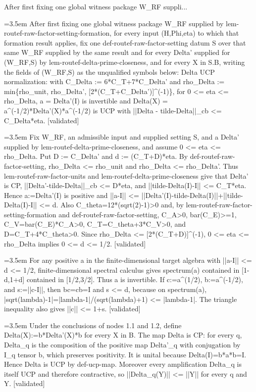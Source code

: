 \documentclass{article}
\newcommand{\step}[1]{\par\noindent\hangindent=3.5em\hangafter=1%
  \makebox[3.5em][l]{\textbf{#1.}}}
\newcommand{\steptag}[1]{\hfill{\small\textsf{[#1]}}}
\begin{document}
\begin{proofbox}{After first fixing one global witness package W\_RF suppli...}
\step{1} After first fixing one global witness package W\_RF supplied by lem-routef-raw-factor-setting-formation, for every input (H,Phi,eta) to which that formation result applies, fix one def-routef-raw-factor-setting datum S over that same W\_RF supplied by the same result and for every Delta' supplied for (W\_RF,S) by lem-routef-delta-prime-closeness, and for every X in S.B, writing the fields of (W\_RF,S) as the unqualified symbols below: Delta UCP normalization: with C\_Delta := 6*C\_T+7*C\_Delta' and rho\_Delta := min\{rho\_unit, rho\_Delta', [2*(C\_T+C\_Delta')]\textasciicircum{}(-1)\}, for 0 <= eta <= rho\_Delta, a = Delta'(I) is invertible and Delta(X) = a\textasciicircum{}(-1/2)*Delta'(X)*a\textasciicircum{}(-1/2) is UCP with ||Delta - tilde-Delta||\_cb <= C\_Delta*eta. \steptag{validated} \\[6pt]
\step{1.1} Fix W\_RF, an admissible input and supplied setting S, and a Delta' supplied by lem-routef-delta-prime-closeness, and assume 0 <= eta <= rho\_Delta. Put D := C\_Delta' and d := (C\_T+D)*eta. By def-routef-raw-factor-setting, rho\_Delta <= rho\_unit and rho\_Delta <= rho\_Delta'. Thus lem-routef-raw-factor-units and lem-routef-delta-prime-closeness give that Delta' is CP, ||Delta'-tilde-Delta||\_cb <= D*eta, and ||tilde-Delta(I)-I|| <= C\_T*eta. Hence a:=Delta'(I) is positive and ||a-I|| <= ||Delta'(I)-tilde-Delta(I)||+||tilde-Delta(I)-I|| <= d. Also C\_theta=12*(sqrt(2)-1)>0 and, by lem-routef-raw-factor-setting-formation and def-routef-raw-factor-setting, C\_A>0, bar(C\_E)>=1, C\_V=bar(C\_E)*C\_A>0, C\_T=C\_theta+3*C\_V>0, and D=C\_T+4*C\_theta>0. Since rho\_Delta <= [2*(C\_T+D)]\textasciicircum{}(-1), 0 <= eta <= rho\_Delta implies 0 <= d <= 1/2. \steptag{validated} \\[4pt]
\step{1.2} For any positive a in the finite-dimensional target algebra with ||a-I|| <= d <= 1/2, finite-dimensional spectral calculus gives spectrum(a) contained in [1-d,1+d] contained in [1/2,3/2]. Thus a is invertible. If c:=a\textasciicircum{}(1/2), b:=a\textasciicircum{}(-1/2), and s:=||c-I||, then bc=cb=I and s <= d, because on spectrum(a), |sqrt(lambda)-1|=|lambda-1|/(sqrt(lambda)+1) <= |lambda-1|. The triangle inequality also gives ||c|| <= 1+s. \steptag{validated} \\[4pt]
\step{1.3} Under the conclusions of nodes 1.1 and 1.2, define Delta(X):=b*Delta'(X)*b for every X in B. The map Delta is CP: for every q, Delta\_q is the composition of the positive map Delta'\_q with conjugation by I\_q tensor b, which preserves positivity. It is unital because Delta(I)=b*a*b=I. Hence Delta is UCP by def-ucp-map. Moreover every amplification Delta\_q is itself UCP and therefore contractive, so ||Delta\_q(Y)|| <= ||Y|| for every q and Y. \steptag{validated} \\[4pt]

\end{proofbox}
\end{document}
